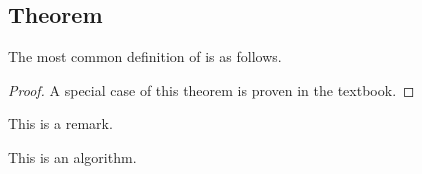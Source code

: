 \subsection{Theorem}

The most common definition of  is as follows.


\begin{proof}
    A special case of this theorem is proven in the textbook.
\end{proof}

\begin{remark}
    This is a remark.
\end{remark}

\begin{algorithm}
    This is an algorithm.
\end{algorithm}

\clearpage